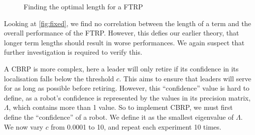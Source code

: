 \begin{figure}[!h]
	\centering
	\caption{Finding the optimal length for a FTRP}
        \label{fig:fixed}
\end{figure}

Looking at \autoref{fig:fixed}, we find no correlation between the length of a term and the overall performance of the FTRP. However, this defies our earlier theory, that longer term lengths should result in worse performances. We again suspect that further investigation is required to verify this.

A CBRP is more complex, here a leader will only retire if its confidence in its localisation falls below the threshold $c$. This aims to ensure that leaders will serve for as long as possible before retiring. However, this ``confidence'' value is hard to define, as a robot's confidence is represented by the values in its precision matrix, $\Lambda$, which contains more than 1 value. So to implement CBRP, we must first define the ``confidence'' of a robot. We define it as the smallest eigenvalue of $\Lambda$. We now vary $c$ from 0.0001 to 10, and repeat each experiment 10 times.

